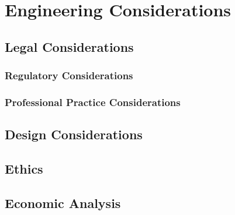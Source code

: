 \section{Engineering Considerations}
\subsection{Legal Considerations}
\subsubsection{Regulatory Considerations}
\subsubsection{Professional Practice Considerations}
\subsection{Design Considerations}
\subsection{Ethics}
\subsection{Economic Analysis}